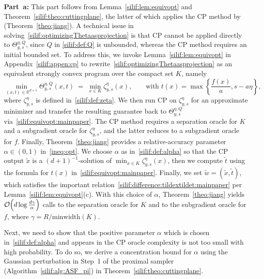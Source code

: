 \documentclass[11pt,letterpaper]{article}
\newcommand{\R}{\mathbb{R}}
\begin{document}
\textbf{Part~a:}  This part follows from Lemma~\ref{silif:lem:equivopt} and Theorem~\ref{silif:theo:cuttingplane}, the latter of which applies the CP method by~\cite{jiang2020cuttingplane} (Theorem~\ref{theo:jiang}). 
A technical issue in solving~\eqref{silif:optimizingThetaasprojection} is that CP cannot be applied directly to $\Theta^{\eta,Q}_{y,s}$, since $Q$ in \eqref{silif:def:Q} is unbounded, whereas the CP method requires an initial bounded set. 
To address this, we invoke Lemma~\ref{silif:lem:equivopt} in Appendix~\ref{silif:appen:cp} to rewrite~\eqref{silif:optimizingThetaasprojection} as an equivalent strongly convex program over the compact set $K$, namely
\begin{equation}
\label{silif:equivopt:mainpaper}
\min_{(x,t)\in \R^{d+1}}\Theta^{\eta,Q}_{y,s}(x,t)\;=\;\min_{x\in K}\zeta^{\eta}_{y,s}(x),
\qquad 
\text{with }t(x)=\max\left\{\frac{f(x)}{a}, s-a\eta\right\},
\end{equation}
where $\zeta^{\eta}_{y,s}$ is defined in~\eqref{silif:def:zeta}. 
We then run CP on $\zeta^{\eta}_{y,s}$ for an approximate minimizer and transfer the resulting guarantee back to $\Theta^{\eta,Q}_{y,s}$ via~\eqref{silif:equivopt:mainpaper}. 
The CP method requires a separation oracle for $K$ and a subgradient oracle for $\zeta^{\eta}_{y,s}$, and the latter reduces to a subgradient oracle for $f$. 
Finally, Theorem~\ref{theo:jiang} provides a relative-accuracy parameter $\alpha\in(0,1)$ in~\eqref{ineq:opt}. We choose $\alpha$ as in~\eqref{silif:def:alpha} so that the CP output $\tilde x$ is a $(d+1)^{-1}$-solution of $\min_{x\in K}\zeta^{\eta}_{y,s}(x)$, then we compute $\tilde{t}$ using the formula for $t(x)$ in~\eqref{silif:equivopt:mainpaper}. Finally, we set $\tilde{w}=(\tilde{x},\tilde{t})$, which satisfies the important relation~\eqref{silif:difference:tildextildet:mainpaper} per Lemma~\ref{silif:lem:equivopt}(c). 
With this choice of $\alpha$, Theorem~\ref{theo:jiang} yields ${\cal O}\!\left(d\log\frac{d\gamma}{\alpha}\right)$ calls to the separation oracle for $K$ and to the subgradient oracle for $f$, where $\gamma=R/\mbox{minwidth}(K)$. 

Next, we need to show that the positive parameter $\alpha$ which is chosen in~\eqref{silif:def:alpha} and appears  in the CP oracle complexity is not too small with high probability. To do so, we derive a concentration bound for $\alpha$ using the Gaussian perturbation in Step~1 of the proximal sampler (Algorithm~\ref{silif:alg:ASF_pi})  in Theorem~\ref{silif:theo:cuttingplane}. 
\end{document}
